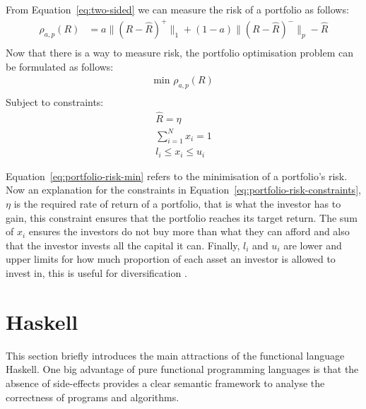 \documentclass{pdfmx4020}
\begin{document}
  From Equation~\ref{eq:two-sided} we can measure the risk of a portfolio as follows:
  \begin{equation} \label{eq:portfolio-risk}
    \begin{split}
      \rho_{a,p}(R) & = a \|(R-\widehat{R})^+\|_1 + (1-a)\|(R-\widehat{R})^-\|_p - \widehat{R} \\
    \end{split}
  \end{equation} 
  Now that there is a way to measure risk, the portfolio optimisation problem can be formulated as follows:
  \begin{equation} \label{eq:portfolio-risk-min}
    \begin{split}
      \text{min } \rho_{a,p}(R) \\
    \end{split}
  \end{equation} 
  Subject to constraints:
  \begin{equation} \label{eq:portfolio-risk-constraints}
    \begin{split}
      \widehat{R} = \eta \\
      \sum\limits_{i=1}^N x_i = 1 \\
      l_i \leq x_i \leq u_i
    \end{split}
  \end{equation} 

  Equation~\ref{eq:portfolio-risk-min} refers to the minimisation of a portfolio's risk. Now an explanation for the constraints in Equation~\ref{eq:portfolio-risk-constraints}, $\eta$ is the required rate of return of a portfolio, that is what the investor has to gain, this constraint ensures that the portfolio reaches its target return. The sum of $x_i$ ensures the investors do not buy more than what they can afford and also that the investor invests all the capital it can. Finally, $l_i$ and $u_i$ are lower and upper limits for how much proportion of each asset an investor is allowed to invest in, this is useful for diversification \cite{diversification}. 

  
  \section{Haskell} %
  \label{sec:haskell}
  This section briefly introduces the main attractions of the functional language Haskell. One big advantage of pure functional programming languages is that the absence of side-effects provides a clear semantic framework to analyse the correctness of programs and algorithms.
\end{document}
